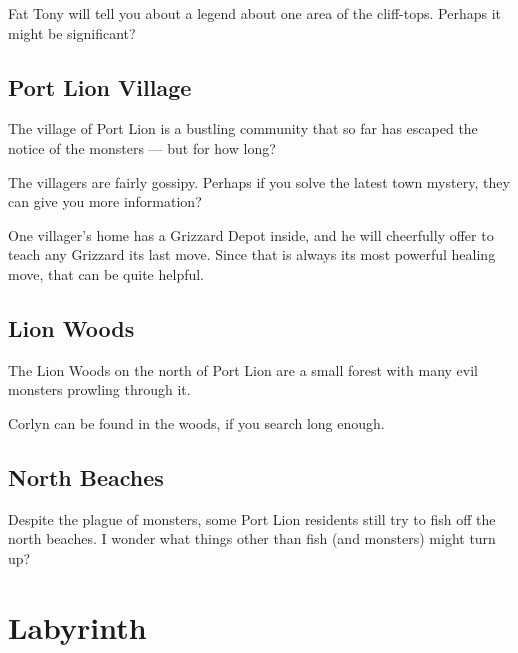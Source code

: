 \documentclass[10pt,twocolumn]{memoir}
\begin{document}
Fat  Tony will  tell  you about  a  legend  about one  area  of the  cliff-tops.
Perhaps it might be significant?

\subsection{Port Lion Village}

The village  of Port Lion is  a bustling community  that so far has  escaped the
notice of the monsters --- but for how long?

The villagers are fairly gossipy. Perhaps  if you solve the latest town mystery,
they can give you more information?

One villager's home has a Grizzard Depot inside, and he will cheerfully offer to
teach any Grizzard its last move. Since that is always its most powerful healing
move, that can be quite helpful.

\subsection{Lion Woods}

The Lion  Woods on  the north of  Port Lion  are a small  forest with  many evil
monsters prowling through it.

Corlyn can be found in the woods, if you search long enough.

\subsection{North Beaches}

Despite the plague of  monsters, some Port Lion residents still  try to fish off
the north  beaches. I wonder  what things other  than fish (and  monsters) might
turn up?

\section{Labyrinth}
\end{document}
